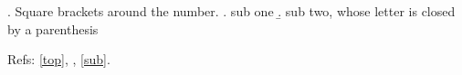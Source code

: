 
\renewcommand{\ExLBr}{[}
\renewcommand{\ExRBr}{]}
\renewcommand{\SubExRBr}{)}

\ex.\label{top} Square brackets around the number.
\a. sub one
\b.\label{sub} sub two, whose letter is closed by a parenthesis

Refs: \ref{top}, , \ref{sub}.

